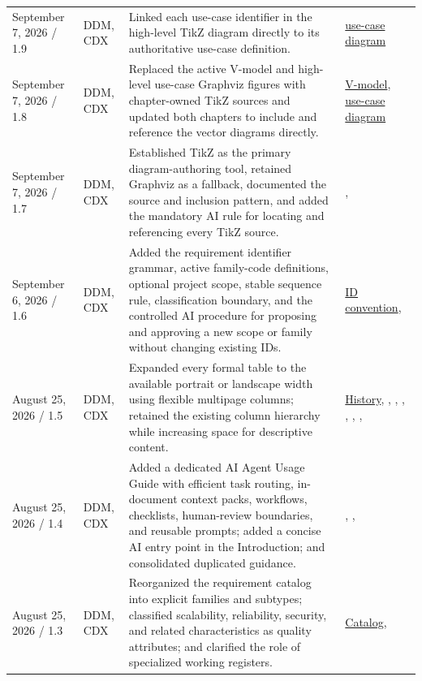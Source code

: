 \begin{tabularx}{\linewidth}{L{3.1cm}L{2.2cm}YL{2.5cm}}
September 7, 2026 / 1.9 & DDM, CDX & Linked each use-case identifier in the high-level TikZ diagram directly to its authoritative use-case definition. & \hyperref[Figure:UseCaseDiagram]{use-case diagram}\\
September 7, 2026 / 1.8 & DDM, CDX & Replaced the active V-model and high-level use-case Graphviz figures with chapter-owned TikZ sources and updated both chapters to include and reference the vector diagrams directly. & \hyperref[Figure:VModel]{V-model}, \hyperref[Figure:UseCaseDiagram]{use-case diagram}\\
September 7, 2026 / 1.7 & DDM, CDX & Established TikZ as the primary diagram-authoring tool, retained Graphviz as a fallback, documented the source and inclusion pattern, and added the mandatory AI rule for locating and referencing every TikZ source. & , \\
September 6, 2026 / 1.6 & DDM, CDX & Added the requirement identifier grammar, active family-code definitions, optional project scope, stable sequence rule, classification boundary, and the controlled AI procedure for proposing and approving a new scope or family without changing existing IDs. & \hyperref[Table:RequirementIdentifierConvention]{ID convention}, \\
August 25, 2026 / 1.5 & DDM, CDX & Expanded every formal table to the available portrait or landscape width using flexible multipage columns; retained the existing column hierarchy while increasing space for descriptive content. & \hyperref[Table:DocumentHistory]{History}, , , , , , , \\
August 25, 2026 / 1.4 & DDM, CDX & Added a dedicated AI Agent Usage Guide with efficient task routing, in-document context packs, workflows, checklists, human-review boundaries, and reusable prompts; added a concise AI entry point in the Introduction; and consolidated duplicated guidance. & , , \\
August 25, 2026 / 1.3 & DDM, CDX & Reorganized the requirement catalog into explicit families and subtypes; classified scalability, reliability, security, and related characteristics as quality attributes; and clarified the role of specialized working registers. & \hyperref[Table:RequirementCategoryCatalog]{Catalog}, \\

\end{tabularx}
